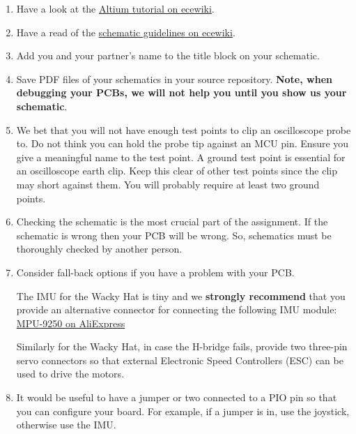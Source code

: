 \documentclass[11pt, a4paper]{article}
\begin{document}
\begin{enumerate}
\item Have a look at the
  \href{http://ecewiki.elec.canterbury.ac.nz/mediawiki/index.php/ENCE461_Altium_tutorial}{Altium
    tutorial on ecewiki}.

\item Have a read of the
  \href{http://ecewiki.elec.canterbury.ac.nz/mediawiki/index.php/Schematic_guidelines}{schematic
    guidelines on ecewiki}.

\item Add you and your partner's name to the title block on your
  schematic.

\item Save PDF files of your schematics in your source repository.
  \textbf{Note, when debugging your PCBs, we will not help you until you show us your
    schematic}.

\item We bet that you will not have enough test points to clip an
  oscilloscope probe to.  Do not think you can hold the probe tip
  against an MCU pin.  Ensure you give a meaningful name to the test
  point.  A ground test point is essential for an oscilloscope earth
  clip. Keep this clear of other test points since the clip may short
  against them.  You will probably require at least two ground points.
  
\item Checking the schematic is the most crucial part of the
  assignment.  If the schematic is wrong then your PCB will be wrong.
  So, schematics must be thoroughly checked by another person.

\item Consider fall-back options if you have a problem with your PCB.

  The IMU for the Wacky Hat is tiny and we \textbf{strongly recommend} that you
  provide an alternative connector for connecting the following IMU module:
  \href{https://www.aliexpress.com/item/SPI-IIC-MPU9250-MPU-9250-MPU-9250-9-Axis-Attitude-Gyro-Accelerator-Magnetometer-Sensor-Module-MPU9250/32216818498.html?spm=a2g0s.9042311.0.0.WKvtEm}{MPU-9250 on AliExpress}

  Similarly for the Wacky Hat, in case the H-bridge fails, provide two
  three-pin servo connectors so that external Electronic Speed
  Controllers (ESC) can be used to drive the motors.

\item It would be useful to have a jumper or two connected to a PIO
  pin so that you can configure your board.  For example, if a jumper
  is in, use the joystick, otherwise use the IMU.
  
\end{enumerate}
\end{document}
